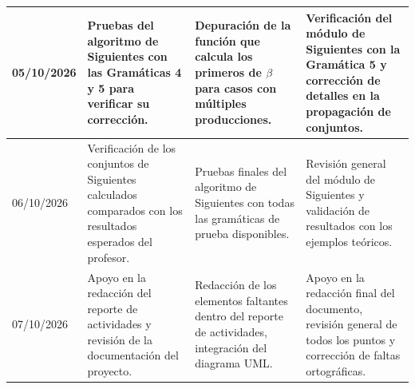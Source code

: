 \begin{longtable}{|P{2cm}|P{4.4cm}|P{4.4cm}|P{4.4cm}|}
05/10/2026 &
  Pruebas del algoritmo de Siguientes con las Gramáticas 4 y 5 para verificar su
  corrección. &
  Depuración de la función que calcula los primeros de $\beta$ para casos con múltiples
  producciones. &
  Verificación del módulo de Siguientes con la Gramática 5 y corrección de detalles en
  la propagación de conjuntos. \\[4pt]
\hline

06/10/2026 &
  Verificación de los conjuntos de Siguientes calculados comparados con los resultados
  esperados del profesor. &
  Pruebas finales del algoritmo de Siguientes con todas las gramáticas de prueba
  disponibles. &
  Revisión general del módulo de Siguientes y validación de resultados con los ejemplos
  teóricos. \\[4pt]
\hline

07/10/2026 &
  Apoyo en la redacción del reporte de actividades y revisión de la documentación del
  proyecto. &
  Redacción de los elementos faltantes dentro del reporte de actividades, integración del
  diagrama UML. &
  Apoyo en la redacción final del documento, revisión general de todos los puntos y
  corrección de faltas ortográficas. \\[4pt]
\hline

\end{longtable}
